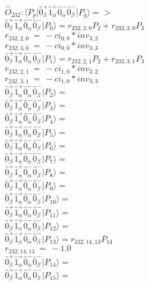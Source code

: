 \documentclass[14pt]{article}
\begin{document}
    $\hat{O}_{232}:  \langle{P_p}\vert \hat{0}_{\beta}^{+}\hat{1}_{\alpha}^{+}\hat{0}_{\alpha}^{-}\hat{0}_{\beta}^{-} \vert{P_q}\rangle => $ \\ 
    $ \hat{0}_{\beta}^{+}\hat{1}_{\alpha}^{+}\hat{0}_{\alpha}^{-}\hat{0}_{\beta}^{-} \vert{P_{0}}\rangle = {r}_{232,2,0}P_{2}+{r}_{232,3,0}P_{3} $ \\ 
    ${r}_{232,2,0}\ =\ -{ci}_{0,0}*{inv}_{3,2} $ \\ 
    ${r}_{232,3,0}\ =\ -{ci}_{0,0}*{inv}_{3,3} $ \\ 
    $ \hat{0}_{\beta}^{+}\hat{1}_{\alpha}^{+}\hat{0}_{\alpha}^{-}\hat{0}_{\beta}^{-} \vert{P_{1}}\rangle = {r}_{232,2,1}P_{2}+{r}_{232,3,1}P_{3} $ \\ 
    ${r}_{232,2,1}\ =\ -{ci}_{1,0}*{inv}_{3,2} $ \\ 
    ${r}_{232,3,1}\ =\ -{ci}_{1,0}*{inv}_{3,3} $ \\ 
    $ \hat{0}_{\beta}^{+}\hat{1}_{\alpha}^{+}\hat{0}_{\alpha}^{-}\hat{0}_{\beta}^{-} \vert{P_{2}}\rangle =  $ \\ 
    $ \hat{0}_{\beta}^{+}\hat{1}_{\alpha}^{+}\hat{0}_{\alpha}^{-}\hat{0}_{\beta}^{-} \vert{P_{3}}\rangle =  $ \\ 
    $ \hat{0}_{\beta}^{+}\hat{1}_{\alpha}^{+}\hat{0}_{\alpha}^{-}\hat{0}_{\beta}^{-} \vert{P_{4}}\rangle =  $ \\ 
    $ \hat{0}_{\beta}^{+}\hat{1}_{\alpha}^{+}\hat{0}_{\alpha}^{-}\hat{0}_{\beta}^{-} \vert{P_{5}}\rangle =  $ \\ 
    $ \hat{0}_{\beta}^{+}\hat{1}_{\alpha}^{+}\hat{0}_{\alpha}^{-}\hat{0}_{\beta}^{-} \vert{P_{6}}\rangle =  $ \\ 
    $ \hat{0}_{\beta}^{+}\hat{1}_{\alpha}^{+}\hat{0}_{\alpha}^{-}\hat{0}_{\beta}^{-} \vert{P_{7}}\rangle =  $ \\ 
    $ \hat{0}_{\beta}^{+}\hat{1}_{\alpha}^{+}\hat{0}_{\alpha}^{-}\hat{0}_{\beta}^{-} \vert{P_{8}}\rangle =  $ \\ 
    $ \hat{0}_{\beta}^{+}\hat{1}_{\alpha}^{+}\hat{0}_{\alpha}^{-}\hat{0}_{\beta}^{-} \vert{P_{9}}\rangle =  $ \\ 
    $ \hat{0}_{\beta}^{+}\hat{1}_{\alpha}^{+}\hat{0}_{\alpha}^{-}\hat{0}_{\beta}^{-} \vert{P_{10}}\rangle =  $ \\ 
    $ \hat{0}_{\beta}^{+}\hat{1}_{\alpha}^{+}\hat{0}_{\alpha}^{-}\hat{0}_{\beta}^{-} \vert{P_{11}}\rangle =  $ \\ 
    $ \hat{0}_{\beta}^{+}\hat{1}_{\alpha}^{+}\hat{0}_{\alpha}^{-}\hat{0}_{\beta}^{-} \vert{P_{12}}\rangle =  $ \\ 
    $ \hat{0}_{\beta}^{+}\hat{1}_{\alpha}^{+}\hat{0}_{\alpha}^{-}\hat{0}_{\beta}^{-} \vert{P_{13}}\rangle = {r}_{232,14,13}P_{14} $ \\ 
    ${r}_{232,14,13}\ =\ -1.0 $ \\ 
    $ \hat{0}_{\beta}^{+}\hat{1}_{\alpha}^{+}\hat{0}_{\alpha}^{-}\hat{0}_{\beta}^{-} \vert{P_{14}}\rangle =  $ \\ 
    $ \hat{0}_{\beta}^{+}\hat{1}_{\alpha}^{+}\hat{0}_{\alpha}^{-}\hat{0}_{\beta}^{-} \vert{P_{15}}\rangle =  $ \\ 
    
\end{document}
